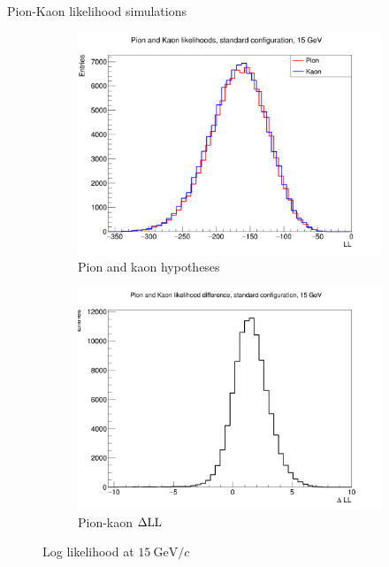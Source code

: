 \documentclass{beamer}
\begin{document}
\begin{frame}{Pion-Kaon likelihood simulations}
  \begin{figure}
    \centering
    \vspace{-0.2cm}
    \begin{subfigure}{0.5\textwidth}
      \includegraphics[width = 1.0\textwidth]{Plots/PionKaonLL15GeVStandard.png}
      \caption{Pion and kaon hypotheses}
    \end{subfigure}%
    \begin{subfigure}{0.5\textwidth}
      \includegraphics[width = 1.0\textwidth]{Plots/PionKaonDLL15GeVStandard.png}
      \caption{Pion-kaon $\Delta{\rm LL}$}
    \end{subfigure}
    \caption{Log likelihood at $\SI{15}{\giga\eV/c}$}
  \end{figure}
\end{frame}
\end{document}
